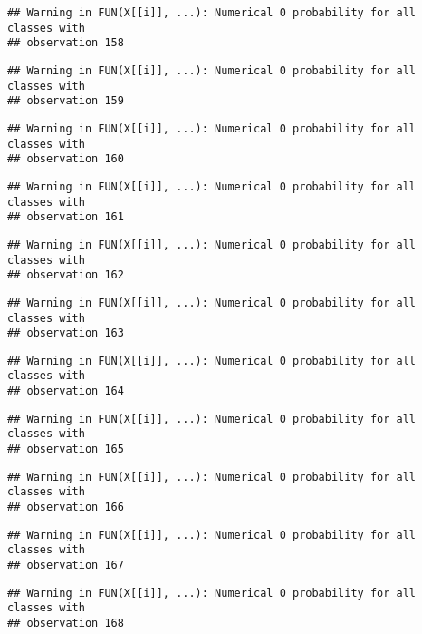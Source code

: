 \documentclass[
]{article}
\begin{document}
\begin{verbatim}
## Warning in FUN(X[[i]], ...): Numerical 0 probability for all classes with
## observation 158
\end{verbatim}

\begin{verbatim}
## Warning in FUN(X[[i]], ...): Numerical 0 probability for all classes with
## observation 159
\end{verbatim}

\begin{verbatim}
## Warning in FUN(X[[i]], ...): Numerical 0 probability for all classes with
## observation 160
\end{verbatim}

\begin{verbatim}
## Warning in FUN(X[[i]], ...): Numerical 0 probability for all classes with
## observation 161
\end{verbatim}

\begin{verbatim}
## Warning in FUN(X[[i]], ...): Numerical 0 probability for all classes with
## observation 162
\end{verbatim}

\begin{verbatim}
## Warning in FUN(X[[i]], ...): Numerical 0 probability for all classes with
## observation 163
\end{verbatim}

\begin{verbatim}
## Warning in FUN(X[[i]], ...): Numerical 0 probability for all classes with
## observation 164
\end{verbatim}

\begin{verbatim}
## Warning in FUN(X[[i]], ...): Numerical 0 probability for all classes with
## observation 165
\end{verbatim}

\begin{verbatim}
## Warning in FUN(X[[i]], ...): Numerical 0 probability for all classes with
## observation 166
\end{verbatim}

\begin{verbatim}
## Warning in FUN(X[[i]], ...): Numerical 0 probability for all classes with
## observation 167
\end{verbatim}

\begin{verbatim}
## Warning in FUN(X[[i]], ...): Numerical 0 probability for all classes with
## observation 168
\end{verbatim}
\end{document}
